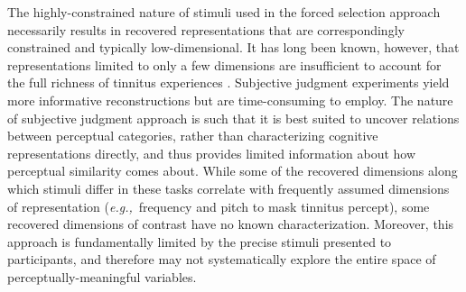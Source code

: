 \documentclass[11pt, notitlepage]{article} %
\def\eg{{\emph{e.g.,}}~}
\begin{document}
The highly-constrained nature of stimuli used in the forced selection approach necessarily results
in recovered representations that are correspondingly constrained and typically low-dimensional. It has
long been known, however, that representations limited to only a few dimensions are insufficient to
account for the full richness of tinnitus experiences
\cite{vajsakovicPrinciplesMethodsPsychoacoustic2021,henryMeasurementTinnitus2016}.
Subjective judgment experiments yield more informative reconstructions but are time-consuming to employ.
The nature of subjective judgment
approach is such that it is best suited to uncover relations between perceptual categories, rather than
characterizing cognitive representations directly, and thus provides limited information about how
perceptual similarity comes about. While some of the recovered dimensions along which stimuli differ in
these tasks correlate with frequently assumed dimensions of representation (\eg frequency and pitch to mask tinnitus percept),
some recovered dimensions of contrast have no known characterization.
Moreover, this approach is fundamentally limited by the precise stimuli presented to participants, and
therefore may not systematically explore the entire space of perceptually-meaningful variables.

\end{document}
